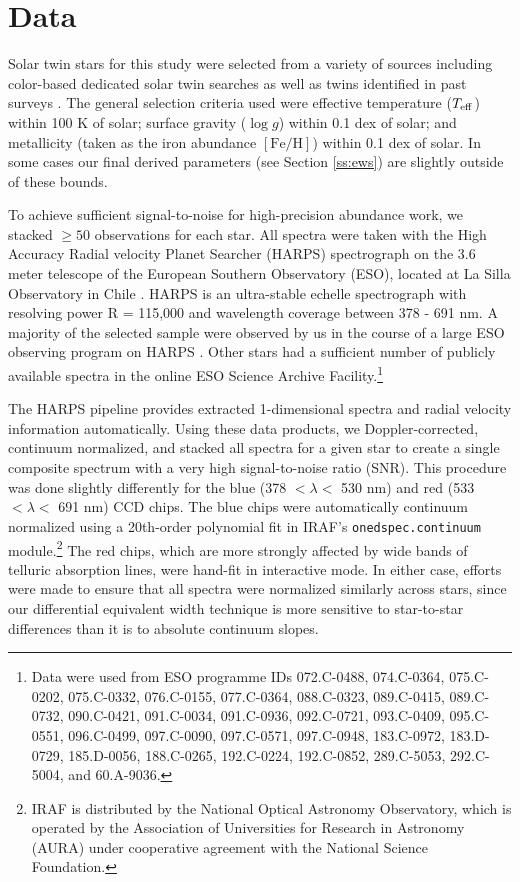 \documentclass[twocolumn, trackchanges]{aastex62}
\newcommand{\teff}{$T_{\rm eff}$}
\newcommand{\logg}{$\log g$}
\newcommand{\feh}{$\mathrm{[Fe/H]}$}
\newcommand{\acronym}[1]{{\small{#1}}}
\begin{document}
\section{Data}

Solar twin stars for this study were selected from a variety of sources including color-based dedicated solar twin searches \citep{melendez07,ramirez09,melendez09} as well as twins identified in past surveys \citep{valenti05,baumann10,bensby14}. The general selection criteria used were effective temperature (\teff) within 100 K of solar; surface gravity (\logg) within 0.1 dex of solar; and metallicity (taken as the iron abundance \feh) within 0.1 dex of solar. In some cases our final derived parameters (see Section \ref{ss:ews}) are slightly outside of these bounds.

To achieve sufficient signal-to-noise for high-precision abundance work, we stacked $\ge50$ observations for each star. 
All spectra were taken with the High Accuracy Radial velocity Planet Searcher (\acronym{HARPS}) spectrograph on the 3.6 meter telescope of the European Southern Observatory (\acronym{ESO}), located at La Silla Observatory in Chile \citep{mayor03}.
\acronym{HARPS} is an ultra-stable echelle spectrograph with resolving power R = 115,000 and wavelength coverage between 378 - 691 nm.
A majority of the selected sample were observed by us in the course of a large \acronym{ESO} observing program on \acronym{HARPS} \citep{melendez15}. Other stars had a sufficient number of publicly available spectra in the online \acronym{ESO} Science Archive Facility.\footnote{Data were used from \acronym{ESO} programme IDs 072.C-0488, 074.C-0364, 075.C-0202, 075.C-0332, 076.C-0155, 077.C-0364, 088.C-0323, 089.C-0415, 089.C-0732, 090.C-0421, 091.C-0034, 091.C-0936, 092.C-0721, 093.C-0409, 095.C-0551, 096.C-0499, 097.C-0090, 097.C-0571, 097.C-0948, 183.C-0972, 183.D-0729, 185.D-0056, 188.C-0265, 192.C-0224, 192.C-0852, 289.C-5053, 292.C-5004, and 60.A-9036.}

The \acronym{HARPS} pipeline provides extracted 1-dimensional spectra and radial velocity information automatically. Using these data products, we Doppler-corrected, continuum normalized, and stacked all spectra for a given star to create a single composite spectrum with a very high signal-to-noise ratio (\acronym{SNR}). This procedure was done slightly differently for the blue (378 $< \lambda <$ 530 nm) and red (533 $< \lambda <$ 691 nm) CCD chips. The blue chips were automatically continuum normalized using a 20th-order polynomial fit in IRAF's \texttt{onedspec.continuum} module.\footnote{IRAF is distributed by the National Optical Astronomy Observatory, which is operated by the Association of Universities for Research in Astronomy (AURA) under cooperative agreement with the National Science Foundation.} The red chips, which are more strongly affected by wide bands of telluric absorption lines, were hand-fit in interactive mode. In either case, efforts were made to ensure that all spectra were normalized similarly across stars, since our differential equivalent width technique is more sensitive to star-to-star differences than it is to absolute continuum slopes.
\end{document}
